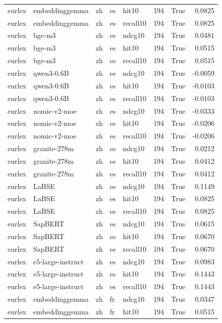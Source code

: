 \begin{tabular}{lllllrrr}
eurlex & embeddinggemma & zh & es & hit10 & 194 & True & 0.0825 \\
eurlex & embeddinggemma & zh & es & recall10 & 194 & True & 0.0825 \\
eurlex & bge-m3 & zh & es & ndcg10 & 194 & True & 0.0481 \\
eurlex & bge-m3 & zh & es & hit10 & 194 & True & 0.0515 \\
eurlex & bge-m3 & zh & es & recall10 & 194 & True & 0.0515 \\
eurlex & qwen3-0.6B & zh & es & ndcg10 & 194 & True & -0.0059 \\
eurlex & qwen3-0.6B & zh & es & hit10 & 194 & True & -0.0103 \\
eurlex & qwen3-0.6B & zh & es & recall10 & 194 & True & -0.0103 \\
eurlex & nomic-v2-moe & zh & es & ndcg10 & 194 & True & -0.0333 \\
eurlex & nomic-v2-moe & zh & es & hit10 & 194 & True & -0.0206 \\
eurlex & nomic-v2-moe & zh & es & recall10 & 194 & True & -0.0206 \\
eurlex & granite-278m & zh & es & ndcg10 & 194 & True & 0.0212 \\
eurlex & granite-278m & zh & es & hit10 & 194 & True & 0.0412 \\
eurlex & granite-278m & zh & es & recall10 & 194 & True & 0.0412 \\
eurlex & LaBSE & zh & es & ndcg10 & 194 & True & 0.1149 \\
eurlex & LaBSE & zh & es & hit10 & 194 & True & 0.0825 \\
eurlex & LaBSE & zh & es & recall10 & 194 & True & 0.0825 \\
eurlex & SapBERT & zh & es & ndcg10 & 194 & True & 0.0615 \\
eurlex & SapBERT & zh & es & hit10 & 194 & True & 0.0670 \\
eurlex & SapBERT & zh & es & recall10 & 194 & True & 0.0670 \\
eurlex & e5-large-instruct & zh & es & ndcg10 & 194 & True & 0.0983 \\
eurlex & e5-large-instruct & zh & es & hit10 & 194 & True & 0.1443 \\
eurlex & e5-large-instruct & zh & es & recall10 & 194 & True & 0.1443 \\
eurlex & embeddinggemma & zh & fr & ndcg10 & 194 & True & 0.0347 \\
eurlex & embeddinggemma & zh & fr & hit10 & 194 & True & 0.0515 \\

\end{tabular}
